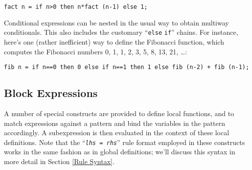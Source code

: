 \documentclass[a4paper,12pt]{article}
\newcommand{\nt}[1]{\textrm{\textit{#1\/}}}
\begin{document}
\begin{lstlisting}
fact n = if n>0 then n*fact (n-1) else 1;
\end{lstlisting}

Conditional expressions can be nested in the usual way to obtain multiway conditionals. This also includes the customary ``\lstinline{else} \lstinline{if}'' chains. For instance, here's one (rather inefficient) way to define the Fibonacci function, which computes the Fibonacci numbers 0, 1, 1, 2, 3, 5, 8, 13, 21, \ldots:

\begin{lstlisting}
fib n = if n==0 then 0 else if n==1 then 1 else fib (n-2) + fib (n-1);
\end{lstlisting}

\subsection{Block Expressions}
\label{Block}

A number of special constructs are provided to define local functions, and to match expressions against a pattern and bind the variables in the pattern accordingly. A subexpression is then evaluated in the context of these local definitions. Note that the ``\texttt{\nt{lhs} = \nt{rhs}}'' rule format employed in these constructs works in the same fashion as in global definitions; we'll discuss this syntax in more detail in Section \ref{Rule Syntax}.
\end{document}

